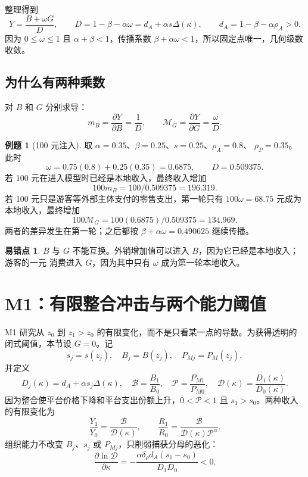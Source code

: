 \documentclass[UTF8,11pt,scheme=chinese,fontset=windows]{ctexart}
\newcommand{\calB}{\mathcal B}
\newcommand{\calD}{\mathcal D}
\newcommand{\calP}{\mathcal P}
\newcommand{\MG}{\mathcal M_G}
\theoremstyle{definition}
\newtheorem{workedexample}{例题}[section]
\newtheorem{commonerror}{易错点}[section]
\begin{document}
整理得到
\[
Y=\frac{B+\omega G}{D},
\qquad
D=1-\beta-\alpha\omega
=d_A+\alpha s\Delta(\kappa),
\qquad
d_A=1-\beta-\alpha\rho_A>0.
\]
因为 \(0\leq\omega\leq1\) 且 \(\alpha+\beta<1\)，传播系数
\(\beta+\alpha\omega<1\)，所以固定点唯一，几何级数收敛。

\subsection{为什么有两种乘数}

对 \(B\) 和 \(G\) 分别求导：
\[
\boxed{
m_B=\frac{\partial Y}{\partial B}=\frac1D,
\qquad
\MG=\frac{\partial Y}{\partial G}=\frac{\omega}{D}.}
\]

\begin{workedexample}[100 元注入]
取 \(\alpha=0.35\)、\(\beta=0.25\)、\(s=0.25\)、\(\rho_A=0.8\)、
\(\rho_P=0.35\)。此时
\[
\omega=0.75(0.8)+0.25(0.35)=0.6875,
\qquad D=0.509375.
\]
若 100 元在进入模型时已经是本地收入，最终收入增加
\[
100m_B=100/0.509375=196.319.
\]
若 100 元只是游客等外部主体支付的零售支出，第一轮只有
\(100\omega=68.75\) 元成为本地收入，最终增加
\[
100\MG=100(0.6875)/0.509375=134.969.
\]
两者的差异发生在第一轮；之后都按 \(\beta+\alpha\omega=0.490625\) 继续传播。
\end{workedexample}

\begin{commonerror}
\(B\) 与 \(G\) 不能互换。外销增加值可以进入 \(B\)，因为它已经是本地收入；游客的一元
消费进入 \(G\)，因为其中只有 \(\omega\) 成为第一轮本地收入。
\end{commonerror}

\section{M1：有限整合冲击与两个能力阈值}

M1 研究从 \(z_0\) 到 \(z_1>z_0\) 的有限变化，而不是只看某一点的导数。为获得透明的
闭式阈值，本节设 \(G=0\)。记
\[
s_j=s(z_j),\quad B_j=B(z_j),\quad P_{Mj}=P_M(z_j),
\]
并定义
\[
D_j(\kappa)=d_A+\alpha s_j\Delta(\kappa),
\quad
\calB=\frac{B_1}{B_0},
\quad
\calP=\frac{P_{M1}}{P_{M0}},
\quad
\calD(\kappa)=\frac{D_1(\kappa)}{D_0(\kappa)}.
\]
因为整合使平台价格下降和平台支出份额上升，\(0<\calP<1\) 且 \(s_1>s_0\)。两种收入
的有限变化为
\[
\boxed{
\frac{Y_1}{Y_0}=\frac{\calB}{\calD(\kappa)},
\qquad
\frac{R_1}{R_0}=\frac{\calB}
{\calD(\kappa)\calP^\alpha}.}
\]
组织能力不改变 \(B_j\)、\(s_j\) 或 \(P_{Mj}\)，只削弱捕获分母的恶化：
\[
\frac{\partial\ln\calD}{\partial\kappa}
=-\frac{\alpha\delta_\rho d_A(s_1-s_0)}{D_1D_0}<0.
\]
\end{document}
